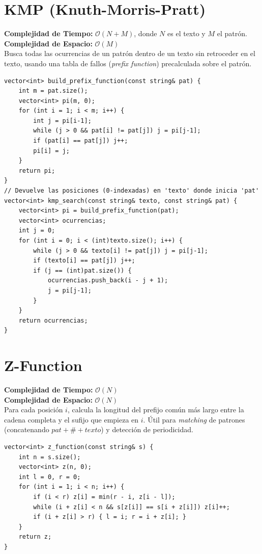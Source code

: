 \documentclass[10pt,twocolumn,letterpaper]{report}
\begin{document}
\section{KMP (Knuth-Morris-Pratt)}
\textbf{Complejidad de Tiempo:} $\mathcal{O}(N + M)$, donde $N$ es el texto y $M$ el patrón. \\
\textbf{Complejidad de Espacio:} $\mathcal{O}(M)$ \\
Busca todas las ocurrencias de un patrón dentro de un texto sin retroceder en el texto, usando una tabla de fallos (\textit{prefix function}) precalculada sobre el patrón.
\begin{lstlisting}
vector<int> build_prefix_function(const string& pat) {
    int m = pat.size();
    vector<int> pi(m, 0);
    for (int i = 1; i < m; i++) {
        int j = pi[i-1];
        while (j > 0 && pat[i] != pat[j]) j = pi[j-1];
        if (pat[i] == pat[j]) j++;
        pi[i] = j;
    }
    return pi;
}
// Devuelve las posiciones (0-indexadas) en 'texto' donde inicia 'pat'
vector<int> kmp_search(const string& texto, const string& pat) {
    vector<int> pi = build_prefix_function(pat);
    vector<int> ocurrencias;
    int j = 0;
    for (int i = 0; i < (int)texto.size(); i++) {
        while (j > 0 && texto[i] != pat[j]) j = pi[j-1];
        if (texto[i] == pat[j]) j++;
        if (j == (int)pat.size()) {
            ocurrencias.push_back(i - j + 1);
            j = pi[j-1];
        }
    }
    return ocurrencias;
}
\end{lstlisting}
\section{Z-Function}
\textbf{Complejidad de Tiempo:} $\mathcal{O}(N)$ \\
\textbf{Complejidad de Espacio:} $\mathcal{O}(N)$ \\
Para cada posición $i$, calcula la longitud del prefijo común más largo entre la cadena completa y el sufijo que empieza en $i$. Útil para \textit{matching} de patrones (concatenando $pat + \# + texto$) y detección de periodicidad.
\begin{lstlisting}
vector<int> z_function(const string& s) {
    int n = s.size();
    vector<int> z(n, 0);
    int l = 0, r = 0;
    for (int i = 1; i < n; i++) {
        if (i < r) z[i] = min(r - i, z[i - l]);
        while (i + z[i] < n && s[z[i]] == s[i + z[i]]) z[i]++;
        if (i + z[i] > r) { l = i; r = i + z[i]; }
    }
    return z;
}
\end{lstlisting}
\end{document}
